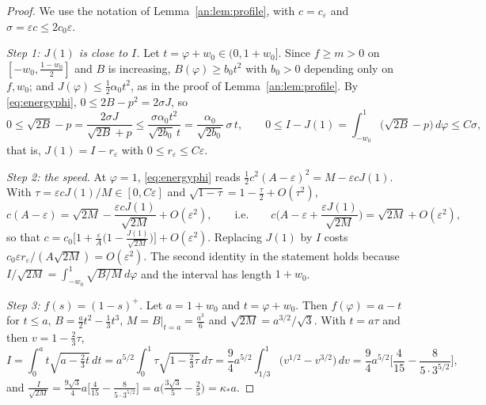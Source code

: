 \documentclass[11pt]{amsart}
\theoremstyle{definition}
\theoremstyle{remark}
\newcommand{\ve}{\varepsilon}
\begin{document}
\begin{proof}
We use the notation of Lemma~\ref{an:lem:profile}, with $c=c_\ve$ and $\sigma=\ve c\le2c_0\ve$.

\emph{Step 1: $J(1)$ is close to $I$.} Let $t=\varphi+w_0\in(0,1+w_0]$. Since
$f\ge m>0$ on $[-w_0,\frac{1-w_0}2]$ and $B$ is increasing, $B(\varphi)\ge b_0t^2$ with
$b_0>0$ depending only on $f,w_0$; and $J(\varphi)\le\frac12\alpha_0t^2$, as in the proof of
Lemma~\ref{an:lem:profile}. By \eqref{eq:energyphi}, $0\le2B-p^2=2\sigma J$, so
\[
0\le\sqrt{2B}-p=\frac{2\sigma J}{\sqrt{2B}+p}\le\frac{\sigma\alpha_0t^2}{\sqrt{2b_0}\,t}
=\frac{\alpha_0}{\sqrt{2b_0}}\,\sigma\,t ,
\qquad
0\le I-J(1)=\int_{-w_0}^1\big(\sqrt{2B}-p\big)\,d\varphi\le C\sigma ,
\]
that is, $J(1)=I-r_\ve$ with $0\le r_\ve\le C\ve$.

\emph{Step 2: the speed.} At $\varphi=1$, \eqref{eq:energyphi} reads
$\frac12c^2(A-\ve)^2=M-\ve cJ(1)$. With $\tau=\ve cJ(1)/M\in[0,C\ve]$ and
$\sqrt{1-\tau}=1-\frac\tau2+O(\tau^2)$,
\[
c(A-\ve)=\sqrt{2M}-\frac{\ve cJ(1)}{\sqrt{2M}}+O(\ve^2),
\qquad\text{i.e.}\qquad
c\Big(A-\ve+\frac{\ve J(1)}{\sqrt{2M}}\Big)=\sqrt{2M}+O(\ve^2),
\]
so that $c=c_0\big[1+\frac\ve A\big(1-\frac{J(1)}{\sqrt{2M}}\big)\big]+O(\ve^2)$. Replacing
$J(1)$ by $I$ costs $c_0\ve r_\ve/(A\sqrt{2M})=O(\ve^2)$. The second identity in the
statement holds because $I/\sqrt{2M}=\int_{-w_0}^1\sqrt{B/M}\,d\varphi$ and the interval
has length $1+w_0$.

\emph{Step 3: $f(s)=(1-s)^+$.} Let $a=1+w_0$ and $t=\varphi+w_0$. Then $f(\varphi)=a-t$ for
$t\le a$, $B=\frac a2t^2-\frac13t^3$, $M=B|_{t=a}=\frac{a^3}6$ and $\sqrt{2M}=a^{3/2}/\sqrt3$.
With $t=a\tau$ and then $v=1-\frac23\tau$,
\[
I=\int_0^at\sqrt{a-\tfrac23t}\,dt=a^{5/2}\int_0^1\tau\sqrt{1-\tfrac23\tau}\,d\tau
=\frac94a^{5/2}\int_{1/3}^1\big(v^{1/2}-v^{3/2}\big)\,dv
=\frac94a^{5/2}\Big[\frac4{15}-\frac{8}{5\cdot3^{5/2}}\Big],
\]
and $\frac{I}{\sqrt{2M}}=\frac{9\sqrt3}{4}a\Big[\frac4{15}-\frac{8}{5\cdot3^{5/2}}\Big]
=a\Big(\frac{3\sqrt3}5-\frac25\Big)=\kappa_*a$.
\end{proof}
\end{document}
